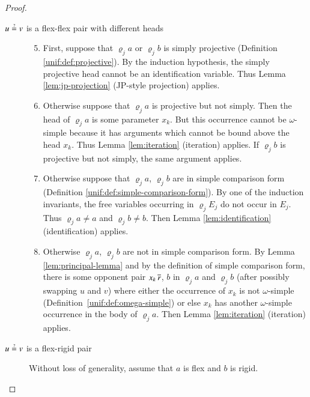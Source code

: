 \begin{proof}
\begin{description}
\begin{enumerate}[beginpenalty=1000]
    \end{enumerate}
    


    \item[\mbox{$u \unif v$} is a flex-flex pair with different heads] \hfill
    \begin{enumerate}
      \setcounter{enumi}{4}
      \item First, suppose that
      $\varrho_j a$ or $\varrho_j b$ is simply projective
      (Definition \ref{unif:def:projective}). 
      By the induction hypothesis, the simply projective head 
      cannot be an identification variable.
      Thus Lemma \ref{lem:jp-projection} (JP-style projection) applies.
      
      \item {} 
      Otherwise suppose that 
      $\varrho_j a$ is projective but not simply.
      Then the head of $\varrho_j a$ is some parameter $x_{k}$. But
      this occurrence cannot be $\omega$-simple because it has arguments
      which cannot be bound above the head $x_{k}$. Thus Lemma \ref{lem:iteration}
      (iteration) applies.
      If $\varrho_j b$ is projective but not simply, the same argument applies.

      \item Otherwise suppose that $\varrho_j a$, $\varrho_j b$ are in simple
      comparison form (Definition \ref{unif:def:simple-comparison-form}).
      By one of the induction invariants,
      the free variables occurring in $\varrho_{j}E_{j}$ do not occur in $E_{j}$.
      Thus $\varrho_{j} a \not= a$ and $\varrho_{j} b \not= b$.
      Then Lemma \ref{lem:identification} (identification) applies.

      \item Otherwise $\varrho_j a$, $\varrho_j b$ are not in simple comparison
      form. By Lemma \ref{lem:principal-lemma} and by the definition of simple comparison form,
      there is some opponent pair $x_{k}\,\overline{r}$, $ b$
      in $\varrho_j a$ and $\varrho_j b$
      (after possibly swapping $u$ and $v$) where either the occurrence
      of $x_{k}$ is not $\omega$-simple (Definition~\ref{unif:def:omega-simple}) or else
      $x_{k}$ has another $\omega$-simple occurrence in the body of $\varrho_j a$.
      Then Lemma \ref{lem:iteration} 
      (iteration) applies.
    \end{enumerate}
    
    \item[$u \unif v$ is a flex-rigid pair]
    Without loss of generality, assume that $a$ is flex and $b$ is rigid.\hfill


\end{description}
\end{proof}
